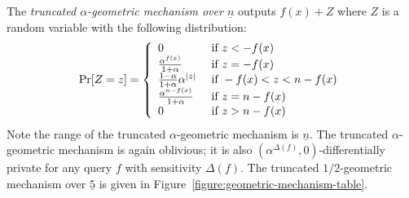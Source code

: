 The \emph{truncated $\alpha$-geometric mechanism over $\underline{n}$}
outputs $f (x) + Z$ where $Z$ is a random variable with the following
distribution:
\[
\Pr[Z = z] =
\left\{
  \begin{array}{ll}
    0 & \textmd{ if } z < - f (x) \\
    \frac{\alpha^{f (x)}}{1 + \alpha} & \textmd{ if } z = -f (x)\\
    \frac{1 - \alpha}{1 + \alpha}\alpha^{|z|} &
    \textmd{ if } -f (x) < z < n - f (x)\\
    \frac{\alpha^{n - f (x)}}{1 + \alpha} & \textmd{ if } z = n-f (x)\\
    0 & \textmd{ if } z > n - f (x)
  \end{array}
\right.
\]
Note the range of the truncated $\alpha$-geometric mechanism is
$\underline{n}$. The truncated $\alpha$-geometric mechanism is
again oblivious; it is also $(\alpha^{\Delta (f)}, 0)$-differentially
private for any query $f$ with sensitivity $\Delta (f)$.
The truncated $1/2$-geometric mechanism over $\underline{5}$ is
given in Figure~\ref{figure:geometric-mechanism-table}.

